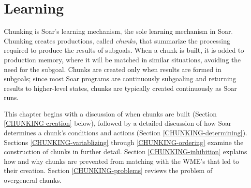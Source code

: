 \chapter{Learning}
\label{CHUNKING}




Chunking is Soar's learning mechanism, the sole learning mechanism in Soar.
Chunking creates productions, called \emph{chunks}, that summarize the
processing required to produce the results of subgoals. When a chunk is built,
it is added to production memory, where it will be matched in similar
situations, avoiding the need for the subgoal. Chunks are created only when
results are formed in subgoals; since most Soar programs are continuously
subgoaling and returning results to higher-level states, chunks are typically
created continuously as Soar runs.

This chapter begins with a discussion of when chunks are built (Section
\ref{CHUNKING-creation} below), followed by a detailed discussion of
how Soar determines a chunk's conditions and actions (Section
\ref{CHUNKING-determining}). Sections \ref{CHUNKING-variablizing} through
\ref{CHUNKING-ordering} examine the construction of chunks in further
detail. Section \ref{CHUNKING-inhibition} explains how and why chunks are
prevented from matching with the WME's that led to their creation. Section
\ref{CHUNKING-problems} reviews the problem of overgeneral chunks.


